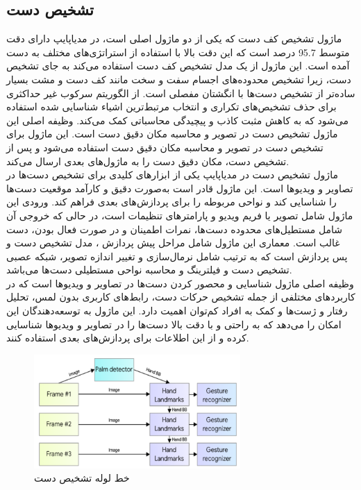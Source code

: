 \subsection{تشخیص دست \protect{}}
ماژول تشخیص کف دست که یکی از دو ماژول اصلی است، در مدیاپایپ دارای دقت متوسط 95.7 درصد است که این دقت بالا با استفاده از استراتژی‌های مختلف به دست آمده است. این ماژول از یک مدل تشخیص کف دست استفاده می‌کند 
به جای تشخیص دست، زیرا تشخیص محدوده‌های اجسام سفت و سخت مانند کف دست و مشت بسیار ساده‌تر از تشخیص دست‌ها با انگشتان مفصلی است. از الگوریتم سرکوب غیر حداکثری برای حذف تشخیص‌های تکراری و انتخاب 
مرتبط‌ترین اشیاء شناسایی شده استفاده می‌شود که به کاهش مثبت کاذب و پیچیدگی محاسباتی کمک می‌کند. وظیفه اصلی این ماژول تشخیص دست در تصویر و محاسبه مکان دقیق دست است. این ماژول برای تشخیص دست در تصویر و 
محاسبه مکان دقیق دست استفاده می‌شود و پس از تشخیص دست، مکان دقیق دست را به ماژول‌های بعدی ارسال می‌کند.
\\
ماژول تشخیص دست در مدیاپایپ یکی از ابزارهای کلیدی برای تشخیص دست‌ها در تصاویر و ویدیوها است. این ماژول قادر است به‌صورت دقیق و کارآمد موقعیت دست‌ها را شناسایی کند و نواحی مربوطه را برای پردازش‌های بعدی فراهم 
کند. ورودی این ماژول شامل تصویر یا فریم ویدیو و پارامترهای تنظیمات است، در حالی که خروجی آن شامل مستطیل‌های محدوده دست‌ها، نمرات اطمینان و در صورت فعال بودن، دست غالب  است. معماری این 
ماژول شامل مراحل پیش پردازش  ، مدل تشخیص دست و پس پردازش   است که به ترتیب شامل نرمال‌سازی و تغییر اندازه تصویر، شبکه عصبی تشخیص دست و فیلترینگ و محاسبه نواحی مستطیلی دست‌ها می‌باشد.
\\
وظیفه اصلی ماژول شناسایی و محصور کردن دست‌ها در تصاویر و ویدیوها است که در کاربردهای مختلفی از جمله تشخیص حرکات دست، رابط‌های کاربری بدون لمس، تحلیل رفتار و ژست‌ها و کمک به افراد کم‌توان اهمیت دارد. این 
ماژول به توسعه‌دهندگان این امکان را می‌دهد که به راحتی و با دقت بالا دست‌ها را در تصاویر و ویدیوها شناسایی کرده و از این اطلاعات برای پردازش‌های بعدی استفاده کنند.


\begin{figure}[h]
    \centering
    \includegraphics[width=0.7\textwidth]{mediapipe.png}
    \caption{خط لوله تشخیص دست}
\end{figure}

